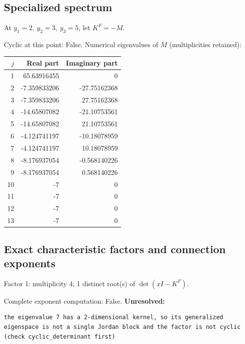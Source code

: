 \documentclass[10pt,a4paper]{article}
\newcommand{\fitmath}[1]{\sbox{\mathbox}{$\displaystyle #1$}\ifdim\wd\mathbox>\linewidth\resizebox{\linewidth}{!}{\usebox{\mathbox}}\else\usebox{\mathbox}\fi}
\begin{document}
\subsection*{Specialized spectrum}
At $y_1=2,\ y_2=3,\ y_3=5$, let $K^F=-M$.
\begin{center}\fitmath{\Delta=0}\end{center}
Cyclic at this point: False.
Numerical eigenvalues of $M$ (multiplicities retained):
\begin{center}\small\begin{tabular}{rrr}\toprule $j$ & Real part & Imaginary part\\\midrule
1 & 65.63916455 & 0\\
2 & -7.359833206 & -27.75162368\\
3 & -7.359833206 & 27.75162368\\
4 & -14.65807082 & -21.10753561\\
5 & -14.65807082 & 21.10753561\\
6 & -4.124741197 & -10.18078959\\
7 & -4.124741197 & 10.18078959\\
8 & -8.176937054 & -0.568140226\\
9 & -8.176937054 & 0.568140226\\
10 & -7 & 0\\
11 & -7 & 0\\
12 & -7 & 0\\
13 & -7 & 0\\
\bottomrule\end{tabular}\end{center}
\subsection*{Exact characteristic factors and connection exponents}
Factor 1: multiplicity 4; 1 distinct root(s) of $\det(xI-K^F)$.
\begin{center}\fitmath{\begin{aligned}p_{1}(x)&=x - 7\end{aligned}}\end{center}
Complete exponent computation: False.
\textbf{Unresolved:}

\begin{lstlisting}
the eigenvalue 7 has a 2-dimensional kernel, so its generalized eigenspace is not a single Jordan block and the factor is not cyclic (check cyclic_determinant first)
\end{lstlisting}
\end{document}
